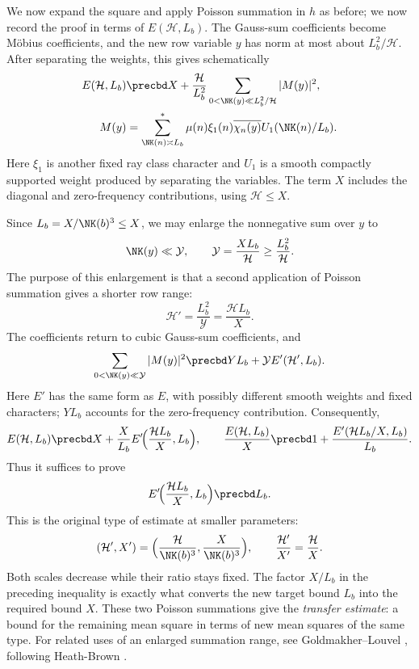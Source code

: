 We now expand the square and apply Poisson summation in $h$ as before; we now record the proof in terms of $E(\mathcal H,L_b)$. The
Gauss-sum coefficients become M\"obius coefficients, and the new
row variable $y$ has norm at most about $L_b^2/\mathcal H$. After
separating the weights, this gives schematically
\[
 \begin{aligned}
 E(\mathcal H,L_b)
 &\precbd X+\frac{\mathcal H}{L_b^2}
 \sum_{0<\NK(y)\ll L_b^2/\mathcal H}|M(y)|^2,\\
 M(y)&=\sum_{\NK(n)\asymp L_b}^*
 \mu(n)\xi_1(n)\overline{\chi_n(y)}U_1(\NK(n)/L_b).
 \end{aligned}
\]
Here $\xi_1$ is another fixed ray class character and $U_1$ is a smooth compactly supported weight produced by separating the variables. The term $X$ includes the diagonal and zero-frequency
contributions, using $\mathcal H\le X$.

Since $L_b=X/\NK(b)^3\le X$, we may enlarge the nonnegative sum over $y$ to
\[
 \NK(y)\ll \mathcal Y,\qquad
 \mathcal Y=\frac{XL_b}{\mathcal H}\ge\frac{L_b^2}{\mathcal H}.
\]
The purpose of this enlargement is that a second application of
Poisson summation gives a shorter row range:
\[
 \mathcal H'=\frac{L_b^2}{\mathcal Y}=\frac{\mathcal HL_b}{X}.
\]
The coefficients return to cubic Gauss-sum coefficients, and
\[
 \sum_{0<\NK(y)\ll \mathcal Y}|M(y)|^2
 \precbd YL_b+\mathcal Y E'(\mathcal H',L_b).
\]
Here $E'$ has the same form as $E$, with possibly different smooth
weights and fixed characters; $YL_b$ accounts for the
zero-frequency contribution. Consequently,
\[
 E(\mathcal H,L_b)
 \precbd X+\frac X{L_b} E'\!\Bigl(\frac{\mathcal HL_b}{X},L_b\Bigr),
 \qquad
 \frac{E(\mathcal H,L_b)}X
 \precbd 1+\frac{E'(\mathcal HL_b/X,L_b)}{L_b}.
\]
Thus it suffices to prove
\[
 E'\!\Bigl(\frac{\mathcal HL_b}{X},L_b\Bigr)\precbd L_b.
\]
This is the original type of estimate at smaller parameters:
\[
 (\mathcal H',X')
 =\Bigl(\frac{\mathcal H}{\NK(b)^3},
         \frac{X}{\NK(b)^3}\Bigr),
 \qquad
 \frac{\mathcal H'}{X'}=\frac{\mathcal H}{X}.
\]
Both scales decrease while their ratio stays fixed. The factor
$X/L_b$ in the preceding inequality is exactly what converts the
new target bound $L_b$ into the required bound $X$.
These two Poisson summations give the \emph{transfer estimate}: a bound
for the remaining mean square in terms of new mean squares of the same type.
For related uses of an enlarged summation range, see
Goldmakher--Louvel
\cite[Lemma~4.4 and the proof of Theorem~4.1]{GL}, following
Heath-Brown \cite[Lemma~9]{HB95}.


